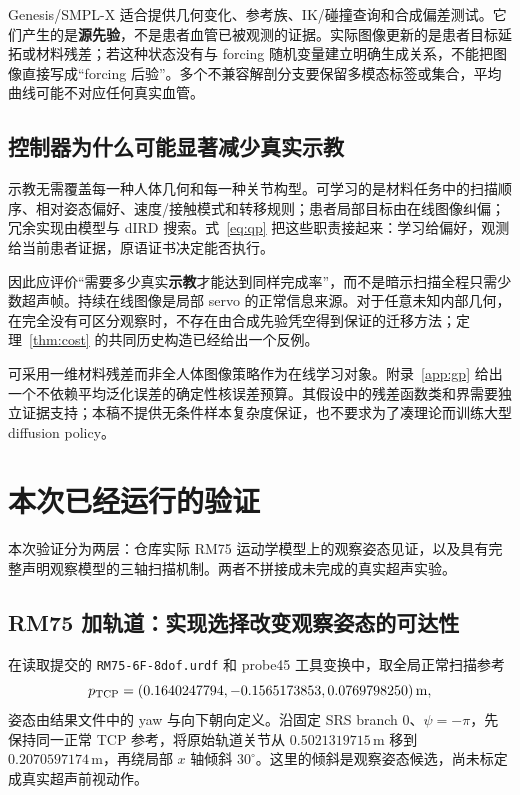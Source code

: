 \documentclass[11pt,a4paper]{article}
\theoremstyle{cn}
\begin{document}
Genesis/SMPL-X 适合提供几何变化、参考族、IK/碰撞查询和合成偏差测试。它们产生的是\textbf{源先验}，不是患者血管已被观测的证据。实际图像更新的是患者目标延拓或材料残差；若这种状态没有与 forcing 随机变量建立明确生成关系，不能把图像直接写成“forcing 后验”。多个不兼容解剖分支要保留多模态标签或集合，平均曲线可能不对应任何真实血管。

\subsection{控制器为什么可能显著减少真实示教}

示教无需覆盖每一种人体几何和每一种关节构型。可学习的是材料任务中的扫描顺序、相对姿态偏好、速度/接触模式和转移规则；患者局部目标由在线图像纠偏；冗余实现由模型与 dIRD 搜索。式~\eqref{eq:qp} 把这些职责接起来：学习给偏好，观测给当前患者证据，原语证书决定能否执行。

因此应评价“需要多少真实\textbf{示教}才能达到同样完成率”，而不是暗示扫描全程只需少数超声帧。持续在线图像是局部 servo 的正常信息来源。对于任意未知内部几何，在完全没有可区分观察时，不存在由合成先验凭空得到保证的迁移方法；定理~\ref{thm:cost} 的共同历史构造已经给出一个反例。

可采用一维材料残差而非全人体图像策略作为在线学习对象。附录~\ref{app:gp} 给出一个不依赖平均泛化误差的确定性核误差预算。其假设中的残差函数类和界需要独立证据支持；本稿不提供无条件样本复杂度保证，也不要求为了凑理论而训练大型 diffusion policy。

\section{本次已经运行的验证}
\label{sec:verification}


本次验证分为两层：仓库实际 RM75 运动学模型上的观察姿态见证，以及具有完整声明观察模型的三轴扫描机制。两者不拼接成未完成的真实超声实验。

\subsection{RM75 加轨道：实现选择改变观察姿态的可达性}
\label{sec:rm75}

在读取提交的 \texttt{RM75-6F-8dof.urdf} 和 probe45 工具变换中，取全局正常扫描参考
\[
p_{\rm TCP}=(0.1640247794,-0.1565173853,0.0769798250)\,\mathrm m,
\]
姿态由结果文件中的 yaw 与向下朝向定义。沿固定 SRS branch \(0\)、\(\psi=-\pi\)，先保持同一正常 TCP 参考，将原始轨道关节从
\(0.5021319715\,\mathrm m\) 移到 \(0.2070597174\,\mathrm m\)，再绕局部 \(x\) 轴倾斜 \(30^\circ\)。这里的倾斜是观察姿态候选，尚未标定成真实超声前视动作。
\end{document}
